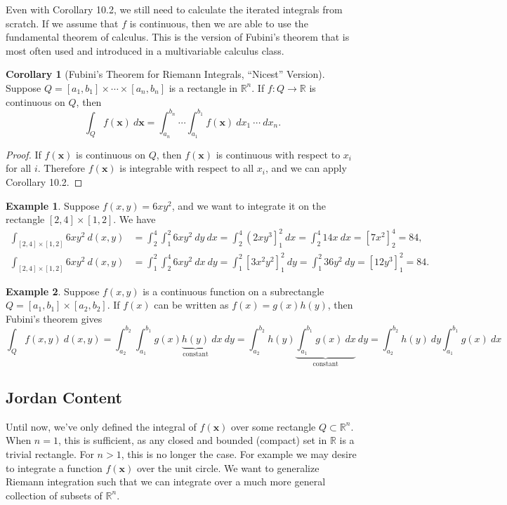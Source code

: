 \documentclass{article}
\newcommand{\R}{\mathbb{R}}
\newcommand{\x}{\mathbf{x}}
\theoremstyle{definition}
\newtheorem{corollary}{Corollary}[section]
\newtheorem{example}{Example}[section]
\begin{document}
Even with Corollary 10.2, we still need to calculate the iterated integrals from scratch. If we assume that $ f $ is continuous, then we are able to use the fundamental theorem of calculus. This is the version of Fubini's theorem that is most often used and introduced in a multivariable calculus class.  

 \begin{corollary}[Fubini's Theorem for Riemann Integrals, ``Nicest'' Version]
	Suppose $ Q= [a_1,b_1]\times \cdots \times [a_n,b_n] $ is a rectangle in $ \R^n $. If $ f:Q\to \R $ is continuous on $ Q $, then 
	$$ \int_Q f(\x)\ d\x = \int_{a_n}^{b_n}\cdots \int_{a_1}^{b_1} f(\x)\ dx_1\ \cdots \ dx_n.$$ 
\end{corollary}
\begin{proof}
	If $ f(\x) $ is continuous on $ Q $, then $ f(\x) $ is continuous with respect to $ x_i $ for all $ i $. Therefore $ f(\x) $ is integrable with respect to all $ x_i $, and we can apply Corollary 10.2.
\end{proof}
\begin{example}
	Suppose $ f(x,y)=6xy^2 $, and we want to integrate it on the rectangle $ [2,4]\times[1,2] $. We have 
	\begin{align*}
		\int_{[2,4]\times [1,2]} 6xy^2\ d(x,y) &= \int_{2}^{4}\int_{1}^{2}6xy^2 \ dy \ dx = \int_{2}^{4}\left(2xy^3\right]_1^2\ dx = \int_{2}^{4}14x \ dx = [7x^2]_2^4 = 84,\\ 
			\int_{[2,4]\times [1,2]} 6xy^2\ d(x,y) & = \int_{1}^{2}\int_{2}^{4}6xy^2 \ dx \ dy = \int_1^2 [3x^2y^2]_1^2 \ dy = \int_{1}^{2}36y^2 \ dy = [12y^3]_1^2 = 84.
	\end{align*}
\end{example}

\begin{example}
	Suppose $ f(x,y) $ is a continuous function on a subrectangle $ Q=[a_1,b_1]\times [a_2,b_2] $. If $ f(x) $ can be written as $ f(x)=g(x)h(y) $, then Fubini's theorem gives 
	$$ \int_Q f(x,y)\ d(x,y) = \int_{a_2}^{b_2}\int_{a_1}^{b_1} g(x)\underbrace{h(y)}_{\text{constant}} \ dx\ dy= \int_{a_2}^{b_2}h(y) \underbrace{\int_{a_1}^{b_1} g(x) \ dx}_{\text{constant}} \ dy = \int_{a_2}^{b_2}h(y) \ dy \int_{a_1}^{b_1} g(x) \ dx$$
\end{example}

	\subsection{Jordan Content}
	
	Until now, we've only defined the integral of $ f(\x) $ over some rectangle $ Q\subset \R^n $. When $ n=1 $, this is sufficient, as any closed and bounded (compact) set in $ \R $ is a trivial rectangle.  For $ n>1 $, this is no longer the case. For example we may desire to integrate a function $ f(\x) $ over the unit circle. We want to generalize Riemann integration such that we can integrate over a much more general collection of subsets of $ \R^n $. 
	
\end{document}
